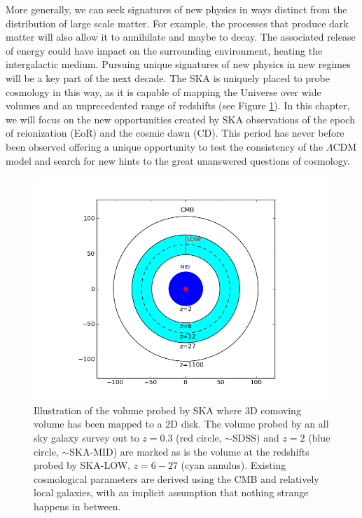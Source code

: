 \documentclass{PoS}
\begin{document}
More generally, we can seek signatures of new physics in ways distinct from the distribution of large scale matter. For example, the processes that produce dark matter will also allow it to annihilate and maybe to decay. The associated release of energy could have impact on the surrounding environment, heating the intergalactic medium. Pursuing unique signatures of new physics in new regimes will be a key part of the next decade.
The SKA is uniquely placed to probe cosmology in this way, as it is capable of mapping the Universe over wide volumes and an unprecedented range of redshifts (see Figure \ref{fig:volume}). In this chapter, we will focus on the new opportunities created by SKA observations of the epoch of reionization (EoR) and the cosmic dawn (CD). This period has never before been observed offering a unique opportunity to test the consistency of the $\Lambda$CDM model and search for new hints to the great unanswered questions of cosmology.

\begin{figure}[htbp]
\begin{center}
\includegraphics[scale=0.45]{figures/volumecirc.png}
\caption{Illustration of the volume probed by SKA where 3D comoving volume has been mapped to a 2D disk. The volume probed by an all sky galaxy survey out to $z=0.3$ (red circle, $\sim$SDSS) and $z=2$ (blue circle, $\sim$SKA-MID) are marked as is the volume at the redshifts probed by SKA-LOW, $z=6-27$ (cyan annulus). Existing cosmological parameters are derived using the CMB and relatively local galaxies, with an implicit assumption that nothing strange happens in between.}
\label{fig:volume}
\end{center}
\end{figure}
\end{document}
